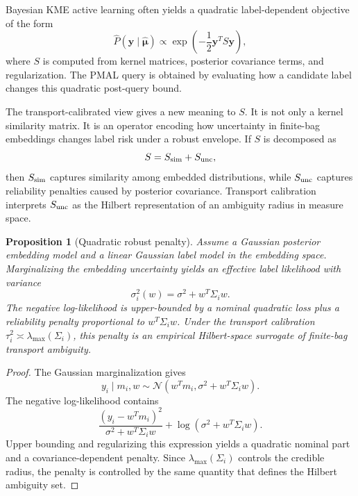 \documentclass[10pt,journal]{IEEEtran}
\newtheorem{proposition}{Proposition}
\newcommand{\wh}{\widehat}
\begin{document}
Bayesian KME active learning often yields a quadratic label-dependent objective of the form
\begin{equation}
\label{eq:quadratic}
    \wh{P}(\mathbf{y}\mid\wh{\bm\mu})\propto \exp\left(-\frac{1}{2}\mathbf{y}^T S\mathbf{y}\right),
\end{equation}
where $S$ is computed from kernel matrices, posterior covariance terms, and regularization. The PMAL query is obtained by evaluating how a candidate label changes this quadratic post-query bound.

The transport-calibrated view gives a new meaning to $S$. It is not only a kernel similarity matrix. It is an operator encoding how uncertainty in finite-bag embeddings changes label risk under a robust envelope. If $S$ is decomposed as
\begin{equation}
    S=S_{\rm sim}+S_{\rm unc},
\end{equation}
then $S_{\rm sim}$ captures similarity among embedded distributions, while $S_{\rm unc}$ captures reliability penalties caused by posterior covariance. Transport calibration interprets $S_{\rm unc}$ as the Hilbert representation of an ambiguity radius in measure space.

\begin{proposition}[Quadratic robust penalty]
\label{prop:quad-penalty}
Assume a Gaussian posterior embedding model and a linear Gaussian label model in the embedding space. Marginalizing the embedding uncertainty yields an effective label likelihood with variance
\begin{equation}
    \sigma_i^2(w)=\sigma^2+w^T\Sigma_i w.
\end{equation}
The negative log-likelihood is upper-bounded by a nominal quadratic loss plus a reliability penalty proportional to $w^T\Sigma_i w$. Under the transport calibration $\tau_i^2\asymp \lambda_{\max}(\Sigma_i)$, this penalty is an empirical Hilbert-space surrogate of finite-bag transport ambiguity.
\end{proposition}

\begin{proof}
The Gaussian marginalization gives
\begin{equation}
    y_i\mid m_i,w\sim \mathcal{N}(w^Tm_i,\sigma^2+w^T\Sigma_iw).
\end{equation}
The negative log-likelihood contains
\begin{equation}
    \frac{(y_i-w^Tm_i)^2}{\sigma^2+w^T\Sigma_iw}+\log(\sigma^2+w^T\Sigma_iw).
\end{equation}
Upper bounding and regularizing this expression yields a quadratic nominal part and a covariance-dependent penalty. Since $\lambda_{\max}(\Sigma_i)$ controls the credible radius, the penalty is controlled by the same quantity that defines the Hilbert ambiguity set.
\end{proof}
\end{document}
